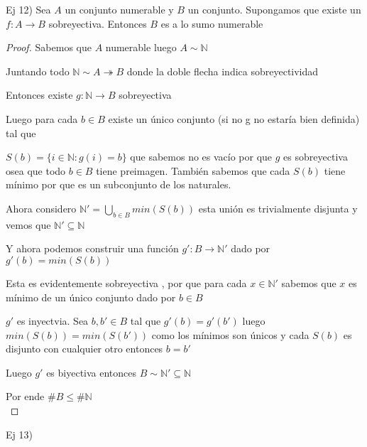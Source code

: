 \documentclass[12pt]{article}
\newcommand{\N}{\mathbb{N}}
\newcommand{\ra}{\rightarrow}
\theoremstyle{definition}
\begin{document}
\noindent
Ej 12) Sea $A$ un conjunto numerable y $B$ un conjunto. Supongamos que existe un $f:A \ra B$ sobreyectiva. Entonces $B$ es a lo sumo numerable
\begin{proof}
  Sabemos que $A$ numerable luego $A \sim \N$

  Juntando todo $\N \sim A \twoheadrightarrow B$ donde la doble flecha indica sobreyectividad

  Entonces existe $g: \N \ra B$ sobreyectiva

  Luego para cada $b \in B$ existe un único conjunto (si no g no estaría bien definida) tal que 

  $S(b) = \{i \in \N : g(i) = b  \}$ que sabemos no es vacío por que $g$ es sobreyectiva osea que todo $b \in B$ tiene preimagen. También sabemos que cada $S(b)$ tiene mínimo por que es un subconjunto de los naturales.

  Ahora considero $\N' = \bigcup_{b \in B} min (S(b)) $ esta unión es trivialmente disjunta y vemos que $\N ' \subseteq \N$

  Y ahora podemos construir una función $g': B  \ra \N '$  dado por $g'(b) = min(S(b))$

  Esta es evidentemente sobreyectiva , por que para cada $x \in \N '$ sabemos que $x$ es mínimo de un único conjunto dado por $b \in B$

  $g'$ es inyectvia. Sea $b, b' \in B$ tal que $g'(b) = g'(b')$ luego $min(S(b)) = min(S(b'))$ como los mínimos son únicos y cada $S(b)$ es disjunto con cualquier otro entonces $b = b'$

  Luego $g'$ es biyectiva entonces $B \sim \N ' \subseteq \N$

  Por ende $\# B \leq \# \N$ \\

\end{proof}


 \noindent Ej 13) 
\end{document}
